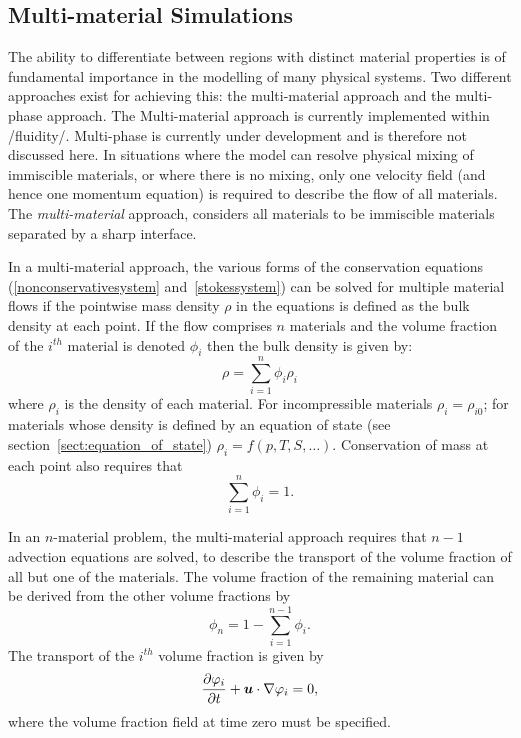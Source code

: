 \subsection{Multi-material Simulations}
The ability to differentiate between regions with distinct material properties is of fundamental importance in the modelling of many physical systems.  Two different approaches exist for achieving this: the multi-material approach and the multi-phase approach.  The Multi-material approach is currently implemented within /fluidity/. Multi-phase is currently under development and is therefore not discussed here. 
In situations where the model can resolve physical mixing of immiscible materials, or where there is no mixing, only one velocity field (and hence one momentum equation) is required to describe the flow of all materials. The \emph{multi-material} approach, considers all materials to be immiscible materials separated by a sharp interface.

In a multi-material approach, the various forms of the conservation equations (\eg \eqref{nonconservativesystem} and~\eqref{stokessystem}) can be solved for multiple material flows if the pointwise mass density $\rho$ in the equations is defined as the bulk density at each point.  If the flow comprises $n$ materials and the volume fraction of the $i^{th}$ material is denoted $\phi_i$ then the bulk density is given by:
\begin{equation}
\rho = \sum_{i=1}^n \phi_i\rho_i
\end{equation}
where $\rho_i$ is the density of each material.  For incompressible materials $\rho_i = \rho_{i0}$; for materials whose density is defined by an equation of state (see section~\ref{sect:equation_of_state}) $\rho_i = f(p,T,S,\ldots)$.  Conservation of mass at each point also requires that
\begin{equation}
\sum_{i=1}^n \phi_{i} = 1.
\end{equation}

In an $n$-material problem, the multi-material approach requires that $n-1$ advection equations are solved, to describe the transport of the volume fraction of all but one of the materials.  The volume fraction of the remaining material can be derived from the other volume fractions by
\begin{equation}\label{diagnosticvolfrac}
\phi_{n} = 1 - \sum_{i=1}^{n-1}\phi_{i}. 
\end{equation}
The transport of the $i^{th}$ volume fraction is given by  
\begin{equation}
\frac{\partial\varphi_i}{\partial t} + {\mbox{\boldmath$u$}}\cdot\nabla\varphi_i = 0,
\end{equation}
where the volume fraction field at time zero must be specified.
